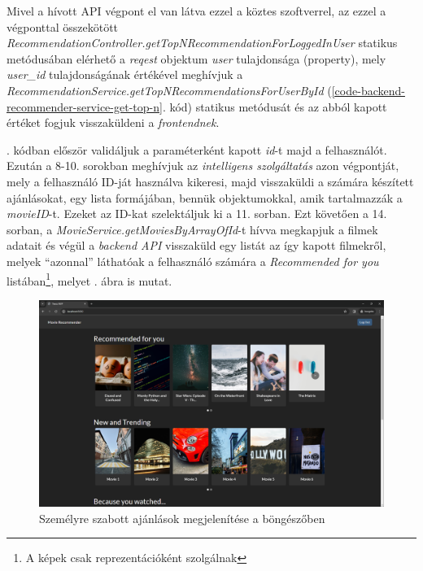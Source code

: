 \documentclass[
]{thesis-ekf}
\theoremstyle{definition}
\theoremstyle{remark}
\begin{document}


Mivel a hívott API végpont el van látva ezzel a köztes szoftverrel, az ezzel a végponttal összekötött \emph{RecommendationController.getTopNRecommendationForLoggedInUser} statikus metódusában elérhető a \emph{reqest} objektum \emph{user} tulajdonsága (property), mely \emph{user\_id} tulajdonságának értékével meghívjuk a  \emph{RecommendationService.getTopNRecom\allowbreak{}mendationsForUserById} (\ref{code-backend-recommender-service-get-top-n}. kód) statikus metódusát és az abból kapott értéket fogjuk visszaküldeni a \emph{frontendnek}.



. kódban először validáljuk a paraméterként kapott \emph{id}-t majd a felhasználót. Ezután a 8-10. sorokban meghívjuk az \emph{intelligens szolgáltatás} azon végpontját, mely a felhasználó ID-ját használva kikeresi, majd visszaküldi a számára készített ajánlásokat, egy lista formájában, bennük objektumokkal, amik tartalmazzák a \emph{movieID}-t. Ezeket az ID-kat szelektáljuk ki a 11. sorban. Ezt követően a 14. sorban, a \emph{MovieService.getMoviesByArrayOfId}-t hívva megkapjuk a filmek adatait és végül a \emph{backend API} visszaküld egy listát az így kapott filmekről, melyek ``azonnal'' láthatóak a felhasználó számára a \emph{Recommended for you} listában\footnote{A képek csak reprezentációként szolgálnak}, melyet . ábra is mutat.

\begin{figure}[H]
	\centering
	\includegraphics[width=14cm]{images/for-you.png}
	\caption[Személyre szabott ajánlások megjelenítése a böngészőben]{Személyre szabott ajánlások megjelenítése a böngészőben}
	\label{fig-frontend-for-you}
\end{figure}
\end{document}

